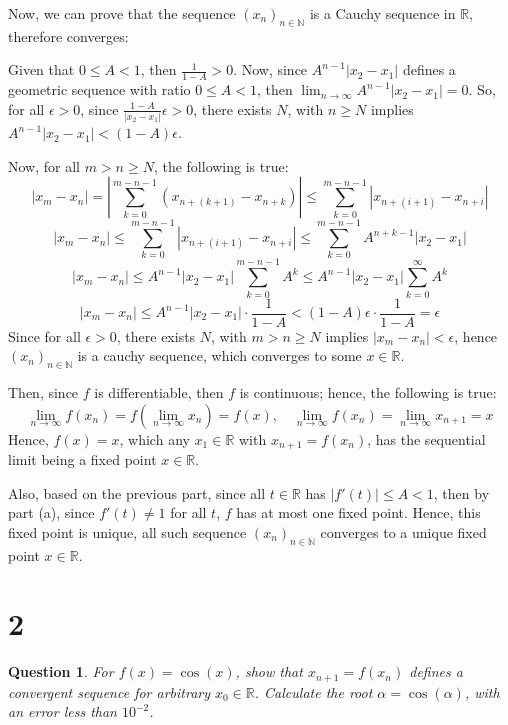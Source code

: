 \documentclass{article}
\newtheorem{question}{Question}
\begin{document}
\begin{itemize}
    \hfil

    Now, we can prove that the sequence $(x_n)_{n\in\mathbb{N}}$ is a Cauchy sequence in $\mathbb{R}$, therefore converges:

    Given that $0\leq A<1$, then $\frac{1}{1-A}>0$. Now, since $A^{n-1}|x_2-x_1|$ defines a geometric sequence with ratio $0\leq A<1$,
    then $\lim_{n\rightarrow\infty}A^{n-1}|x_2-x_1|=0$. So, for all $\epsilon>0$, since $\frac{1-A}{|x_2-x_1|}\epsilon>0$, there exists $N$,
    with $n\geq N$ implies $A^{n-1}|x_2-x_1|<(1-A)\epsilon$.

    Now, for all $m>n\geq N$, the following is true:
    $$|x_m-x_n| = \left|\sum_{k=0}^{m-n-1}(x_{n+(k+1)}-x_{n+k})\right| \leq \sum_{k=0}^{m-n-1}|x_{n+(i+1)}-x_{n+i}|$$
    $$|x_m-x_n|\leq \sum_{k=0}^{m-n-1}|x_{n+(i+1)}-x_{n+i}| \leq \sum_{k=0}^{m-n-1}A^{n+k-1}|x_2-x_1|$$
    $$|x_m-x_n|\leq A^{n-1}|x_2-x_1|\sum_{k=0}^{m-n-1}A^{k} \leq A^{n-1}|x_2-x_1|\sum_{k=0}^{\infty}A^k$$
    $$|x_m-x_n|\leq A^{n-1}|x_2-x_1|\cdot\frac{1}{1-A} < (1-A)\epsilon \cdot \frac{1}{1-A} = \epsilon$$
    Since for all $\epsilon>0$, there exists $N$, with $m>n\geq N$ implies $|x_m-x_n|<\epsilon$, hence $(x_n)_{n\in\mathbb{N}}$ is a cauchy sequence,
    which converges to some $x\in \mathbb{R}$.

    Then, since $f$ is differentiable, then $f$ is continuous; hence, the following is true:
    $$\lim_{n\rightarrow\infty}f(x_n)=f\left(\lim_{n\rightarrow\infty}x_n\right)=f(x),\quad \lim_{n\rightarrow\infty}f(x_n)=\lim_{n\rightarrow\infty}x_{n+1}=x$$
    Hence, $f(x)=x$, which any $x_1\in\mathbb{R}$ with $x_{n+1}=f(x_n)$, has the sequential limit being a fixed point $x\in\mathbb{R}$.

    Also, based on the previous part, since all $t\in\mathbb{R}$ has $|f'(t)|\leq A<1$, then by part (a), since $f'(t)\neq 1$ for all $t$, $f$ has at most one fixed point.
    Hence, this fixed point is unique, all such sequence $(x_n)_{n\in\mathbb{N}}$ converges to a unique fixed point $x\in\mathbb{R}$.
\end{itemize}

\break

\section*{2}
\begin{myBox}[]{}
    \begin{question}
        For $f(x) = \cos(x)$, show that $x_{n+1}=f(x_n)$ defines a convergent sequence
        for arbitrary $x_0\in\mathbb{R}$. Calculate the root $\alpha=\cos(\alpha)$, with an error less than
        $10^{-2}$.
    \end{question}
\end{myBox}
\end{document}
